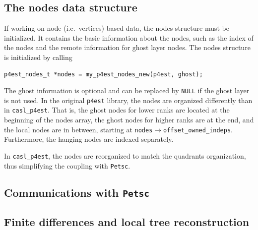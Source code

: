 \documentclass{article}
\newcommand{\ttt}[1]{\texttt{#1}}
\begin{document}
\subsection{The nodes data structure}

If working on node (i.e.\ vertices) based data, the nodes structure must be initialized. It contains the basic information about the nodes, such as the index of the nodes and the remote information for ghost layer nodes. The nodes structure is initialized by calling
\begin{Verbatim}[frame=single]
p4est_nodes_t *nodes = my_p4est_nodes_new(p4est, ghost);
\end{Verbatim}
The ghost information is optional and can be replaced by \ttt{NULL} if the ghost layer is not used. In the original \ttt{p4est} library, the nodes are organized differently than in \ttt{casl\_p4est}. That is, the ghost nodes for lower ranks are located at the beginning of the nodes array, the ghost nodes for higher ranks are at the end, and the local nodes are in between, starting at \ttt{nodes$\rightarrow$offset\_owned\_indeps}. Furthermore, the hanging nodes are indexed separately.

In \ttt{casl\_p4est}, the nodes are reorganized to match the quadrants organization, thus simplifying the coupling with \ttt{Petsc}.

\subsection{Communications with \texttt{Petsc}}


\subsection{Finite differences and local tree reconstruction}

\newpage


\end{document}
